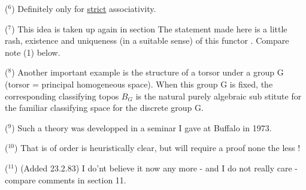 ($^6$) Definitely only for \uline{strict} associativity.

($^7$) This idea is taken up again in section  The statement made here
is a little rash,   existence and uniqueness (in a
suitable sense) of this functor\hand{,} . Compare note (1) below.

($^8$) Another important example is the structure of a torsor under a group
G (torsor = principal homogeneous space). When this group G is fixed,
the corresponding classifying topos $B_G$ is the natural purely algebraic sub%
\hand{-}stitute for the familiar classifying space for the discrete group G.

($^9$) Such a theory was developped in a seminar I gave at Buffalo in 1973.

($^{10}$) That  is of order  is heuristically clear, but will require a
proof none the less !

($^{11}$) (Added 23.2.83) I do'nt believe it now any more - and I do not 
really care - compare comments in section 11.

